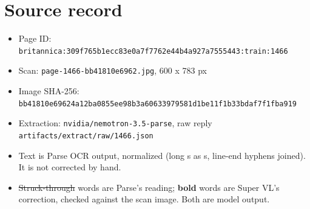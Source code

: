 \documentclass[10pt]{article}
\begin{document}
\section*{Source record}
\begin{itemize}
\item Page ID: \texttt{britannica:309f765b1ecc83e0a7f7762e44b4a927a7555443:train:1466}
\item Scan: \texttt{page-1466-bb41810e6962.jpg}, 600 x 783 px
\item Image SHA-256: \texttt{\small bb41810e69624a12ba0855ee98b3a60633979581d1be11f1b33bdaf7f1fba919}
\item Extraction: \texttt{nvidia/nemotron-3.5-parse}, raw reply \texttt{artifacts/extract/raw/1466.json}
\item Text is Parse OCR output, normalized (long s as s, line-end hyphens joined). It is not corrected by hand.
\item \sout{Struck-through} words are Parse's reading; \textbf{bold} words are Super VL's correction, checked against the scan image. Both are model output.
\end{itemize}
\end{document}
